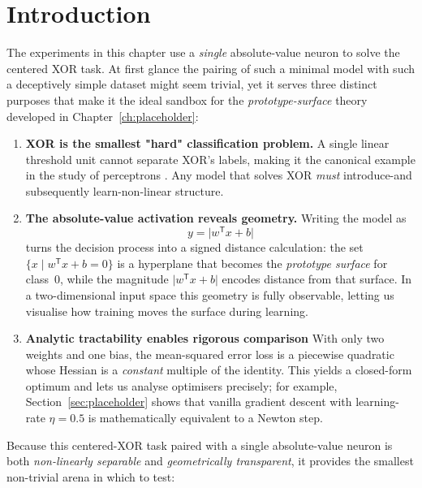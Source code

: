 ﻿%
\section{Introduction}
\label{sec:abs1-introduction}

The experiments in this chapter use a \emph{single} absolute-value neuron to solve the centered XOR task.  At first glance the pairing of such a minimal model with such a deceptively simple dataset might seem trivial, yet it serves three distinct purposes that make it the ideal sandbox for the \textit{prototype-surface} theory developed in Chapter~\ref{ch:placeholder}:

\begin{enumerate}[leftmargin=*]

\item \textbf{XOR is the smallest "hard" classification problem.}
A single linear threshold unit cannot separate XOR's labels, making it the canonical example in the study of perceptrons
\cite{minsky1969perceptrons}.  Any model that solves XOR \emph{must} introduce-and subsequently learn-non-linear structure.

\item \textbf{The absolute-value activation reveals geometry.}
Writing the model as
\[
y = \lvert w^{\mathsf T}x + b \rvert
\]
turns the decision process into a signed distance calculation: the set $\{x \mid w^{\mathsf T}x + b = 0\}$ is a hyperplane that becomes the \emph{prototype surface} for class~$0$, while the magnitude $\lvert w^{\mathsf T}x + b\rvert$ encodes distance from that surface. In a two-dimensional input space this geometry is fully observable, letting us visualise how training moves the surface during learning.

\item \textbf{Analytic tractability enables rigorous comparison}
With only two weights and one bias, the mean-squared error loss is a piecewise quadratic whose Hessian is a \emph{constant} multiple of the identity.  This yields a closed-form optimum and lets us analyse
optimisers precisely; for example, Section~\ref{sec:placeholder} shows that vanilla gradient descent with learning-rate
$\eta = 0.5$ is mathematically equivalent to a Newton step.

\end{enumerate}

Because this centered-XOR task paired with a single absolute-value neuron is both \emph{non-linearly separable} and \emph{geometrically transparent}, it provides the smallest non-trivial arena in which to test:

